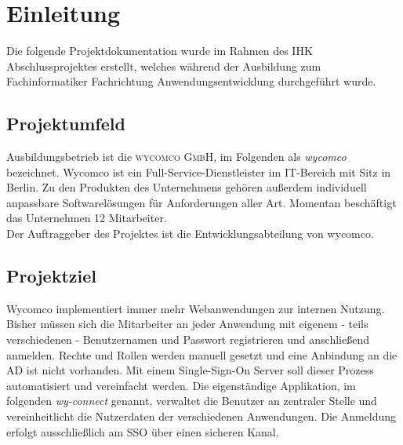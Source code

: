 \section{Einleitung}
\label{sec:Einleitung}
Die folgende Projektdokumentation wurde im Rahmen des IHK Abschlussprojektes erstellt, welches während der Ausbildung zum Fachinformatiker Fachrichtung Anwendungsentwicklung durchgeführt wurde.
\subsection{Projektumfeld} 
\label{sec:Projektumfeld}
Ausbildungsbetrieb ist die \textsc{wycomco GmbH}, im Folgenden als \textit{wycomco} bezeichnet. Wycomco ist ein Full-Service-Dienstleister im IT-Bereich mit Sitz in Berlin. Zu den Produkten des Unternehmens gehören außerdem individuell anpassbare Softwarelösungen für Anforderungen aller Art. Momentan beschäftigt das Unternehmen 12 Mitarbeiter. \\
Der Auftraggeber des Projektes ist die Entwicklungsabteilung von wycomco. 
\subsection{Projektziel} 
\label{sec:Projektziel}
Wycomco implementiert immer mehr Webanwendungen zur internen Nutzung. Bisher müssen sich die Mitarbeiter an jeder Anwendung mit eigenem - teils verschiedenen - Benutzernamen und Passwort registrieren und anschließend anmelden. Rechte und Rollen werden manuell gesetzt und eine Anbindung an die \acs{AD} ist nicht vorhanden.
Mit einem Single-Sign-On Server soll dieser Prozess automatisiert und vereinfacht werden. Die eigenständige Applikation, im folgenden \textit{wy-connect} genannt, verwaltet die Benutzer an zentraler Stelle und vereinheitlicht die Nutzerdaten der verschiedenen Anwendungen. Die Anmeldung erfolgt ausschließlich am SSO über einen sicheren Kanal. 
